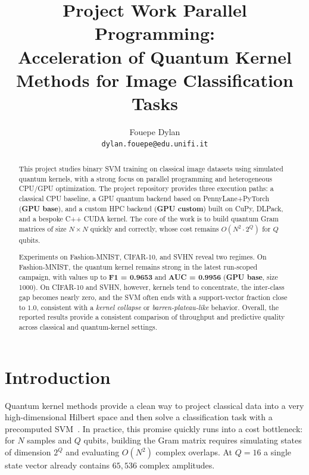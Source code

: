 \documentclass[10pt,twocolumn,letterpaper]{article}
\begin{document}
\title{Project Work Parallel Programming: \\ Acceleration of Quantum Kernel Methods for Image Classification Tasks}

\author{Fouepe Dylan\\
{\tt\small dylan.fouepe@edu.unifi.it}}

\maketitle
\thispagestyle{empty}

\begin{abstract}
This project studies binary SVM training on classical image datasets using simulated quantum kernels, 
with a strong focus on parallel programming and heterogeneous CPU/GPU optimization. 
The project repository provides three execution paths: a classical CPU baseline, a GPU quantum backend 
based on PennyLane+PyTorch (\textbf{GPU base}), and a custom HPC backend (\textbf{GPU custom}) built on CuPy, 
DLPack, and a bespoke C++ CUDA kernel. The core of the work is to build quantum Gram matrices of size $N \times N$ 
quickly and correctly, whose cost remains $O(N^2 \cdot 2^Q)$ for $Q$ qubits.

Experiments on Fashion-MNIST, CIFAR-10, and SVHN reveal two regimes. On Fashion-MNIST, the quantum kernel 
remains strong in the latest run-scoped campaign, with values up to \textbf{F1 = 0.9653} and 
\textbf{AUC = 0.9956} (\textbf{GPU base}, size 1000). On CIFAR-10 and SVHN, however, kernels tend to concentrate, 
the inter-class gap becomes nearly zero, and the SVM often ends with a support-vector fraction close to $1.0$, 
consistent with a \emph{kernel collapse} or \emph{barren-plateau-like} behavior. Overall, the reported 
results provide a consistent comparison of throughput and predictive quality across classical and 
quantum-kernel settings.
\end{abstract}

\section{Introduction}
Quantum kernel methods provide a clean way to project classical data into a very high-dimensional Hilbert space 
and then solve a classification task with a precomputed SVM~\cite{havlicek2019supervised}. 
In practice, this promise quickly runs into a cost bottleneck: for $N$ samples and $Q$ qubits, building 
the Gram matrix requires simulating states of dimension $2^Q$ and evaluating $O(N^2)$ complex overlaps. 
At $Q=16$ a single state vector already contains $65{,}536$ complex amplitudes.
\end{document}
